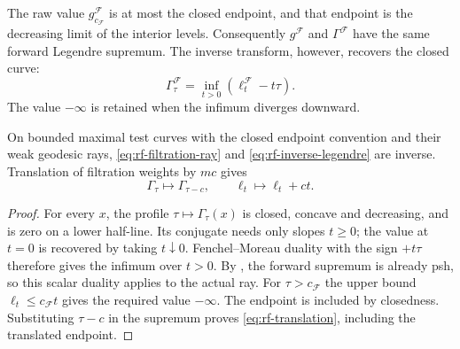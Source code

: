 The raw value $g_{c_{\mathcal F}}^{\mathcal F}$ is at most the closed endpoint, and that endpoint is the decreasing limit of the interior levels. Consequently $g^{\mathcal F}$ and $\Gamma^{\mathcal F}$ have the same forward Legendre supremum. The inverse transform, however, recovers the closed curve:
\[
 \Gamma_\tau^{\mathcal F}
       =\inf_{t>0}(\ell_t^{\mathcal F}-t\tau).
\tag{65.17}\label{eq:rf-inverse-legendre}
\]
The value $-\infty$ is retained when the infimum diverges downward.

\noindent\begin{minipage}{\linewidth}
\begin{proposition}\label{prop:rf-legendre-biconjugacy}
On bounded maximal test curves with the closed endpoint convention and their weak geodesic rays, \eqref{eq:rf-filtration-ray} and \eqref{eq:rf-inverse-legendre} are inverse. Translation of filtration weights by $mc$ gives
\[
 \Gamma_\tau\longmapsto\Gamma_{\tau-c},
 \qquad \ell_t\longmapsto\ell_t+ct.
\tag{65.18}\label{eq:rf-translation}
\]
\end{proposition}
\end{minipage}\par

\begin{proof}
For every $x$, the profile $\tau\mapsto\Gamma_\tau(x)$ is closed, concave and decreasing, and is zero on a lower half-line. Its conjugate needs only slopes $t\geq0$; the value at $t=0$ is recovered by taking $t\downarrow0$. Fenchel--Moreau duality with the sign $+t\tau$ therefore gives the infimum over $t>0$. By , the forward supremum is already psh, so this scalar duality applies to the actual ray. For $\tau>c_{\mathcal F}$ the upper bound $\ell_t\leq c_{\mathcal F}t$ gives the required value $-\infty$. The endpoint is included by closedness. Substituting $\tau-c$ in the supremum proves \eqref{eq:rf-translation}, including the translated endpoint.
\end{proof}

